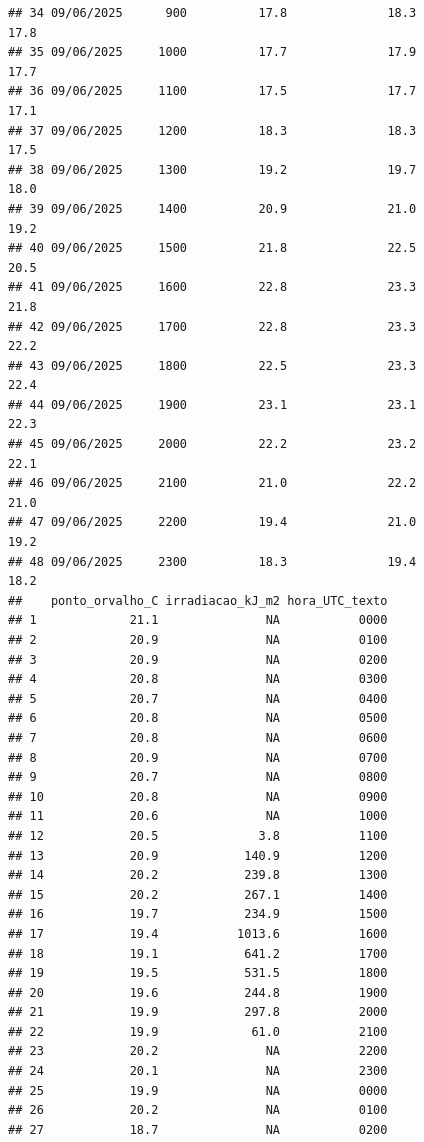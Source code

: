 \documentclass[
]{article}
\begin{document}
\begin{verbatim}
## 34 09/06/2025      900          17.8              18.3              17.8
## 35 09/06/2025     1000          17.7              17.9              17.7
## 36 09/06/2025     1100          17.5              17.7              17.1
## 37 09/06/2025     1200          18.3              18.3              17.5
## 38 09/06/2025     1300          19.2              19.7              18.0
## 39 09/06/2025     1400          20.9              21.0              19.2
## 40 09/06/2025     1500          21.8              22.5              20.5
## 41 09/06/2025     1600          22.8              23.3              21.8
## 42 09/06/2025     1700          22.8              23.3              22.2
## 43 09/06/2025     1800          22.5              23.3              22.4
## 44 09/06/2025     1900          23.1              23.1              22.3
## 45 09/06/2025     2000          22.2              23.2              22.1
## 46 09/06/2025     2100          21.0              22.2              21.0
## 47 09/06/2025     2200          19.4              21.0              19.2
## 48 09/06/2025     2300          18.3              19.4              18.2
##    ponto_orvalho_C irradiacao_kJ_m2 hora_UTC_texto
## 1             21.1               NA           0000
## 2             20.9               NA           0100
## 3             20.9               NA           0200
## 4             20.8               NA           0300
## 5             20.7               NA           0400
## 6             20.8               NA           0500
## 7             20.8               NA           0600
## 8             20.9               NA           0700
## 9             20.7               NA           0800
## 10            20.8               NA           0900
## 11            20.6               NA           1000
## 12            20.5              3.8           1100
## 13            20.9            140.9           1200
## 14            20.2            239.8           1300
## 15            20.2            267.1           1400
## 16            19.7            234.9           1500
## 17            19.4           1013.6           1600
## 18            19.1            641.2           1700
## 19            19.5            531.5           1800
## 20            19.6            244.8           1900
## 21            19.9            297.8           2000
## 22            19.9             61.0           2100
## 23            20.2               NA           2200
## 24            20.1               NA           2300
## 25            19.9               NA           0000
## 26            20.2               NA           0100
## 27            18.7               NA           0200

\end{verbatim}
\end{document}
